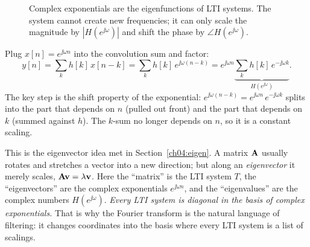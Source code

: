 \begin{figure}[H]
\centering
{}
\caption{Complex exponentials are the eigenfunctions of LTI systems. The system cannot create new frequencies; it can only scale the magnitude by $|H(e^{\jj\omega})|$ and shift the phase by $\angle H(e^{\jj\omega})$.}
\label{ch12:fig-eigen-block}
\end{figure}

\begin{whybox}
Plug $x[n]=e^{\jj\omega n}$ into the convolution sum and factor:
\[
  y[n] = \sum_{k} h[k]\,x[n-k]
       = \sum_{k} h[k]\,e^{\jj\omega(n-k)}
       = e^{\jj\omega n}\underbrace{\sum_{k} h[k]\,e^{-\jj\omega k}}_{H(e^{\jj\omega})}.
\]
The key step is the shift property of the exponential: $e^{\jj\omega(n-k)} =
e^{\jj\omega n}\,e^{-\jj\omega k}$ splits into the part that depends on $n$
(pulled out front) and the part that depends on $k$ (summed against $h$). The
$k$-sum no longer depends on $n$, so it is a constant scaling.
\end{whybox}

\begin{happeningbox}
This is the eigenvector idea met in Section~\ref{ch04:eigen}. A matrix $\mathbf{A}$
usually rotates and stretches a vector into a new direction; but along an
\emph{eigenvector} it merely scales, $\mathbf{A}\mathbf{v}=\lambda\mathbf{v}$. Here the
``matrix'' is the LTI system $T$, the ``eigenvectors'' are the complex
exponentials $e^{\jj\omega n}$, and the ``eigenvalues'' are the complex numbers
$H(e^{\jj\omega})$. \emph{Every LTI system is diagonal in the basis of complex
exponentials.} That is why the Fourier transform is the natural
language of filtering: it changes coordinates into the basis where every LTI
system is a list of scalings.
\end{happeningbox}

